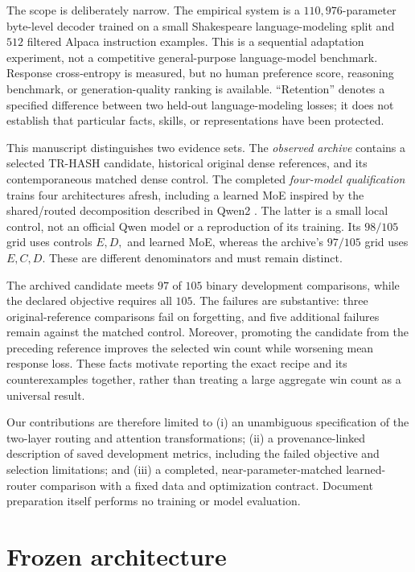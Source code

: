 \documentclass{article}
\newcommand{\Source}{\textsc{TR-HASH}}
\begin{document}
The scope is deliberately narrow. The empirical system is a $110{,}976$-parameter byte-level decoder trained on a small Shakespeare language-modeling split and $512$ filtered Alpaca instruction examples. This is a sequential adaptation experiment, not a competitive general-purpose language-model benchmark. Response cross-entropy is measured, but no human preference score, reasoning benchmark, or generation-quality ranking is available. ``Retention'' denotes a specified difference between two held-out language-modeling losses; it does not establish that particular facts, skills, or representations have been protected.

This manuscript distinguishes two evidence sets. The \emph{observed archive} contains a selected \Source{} candidate, historical original dense references, and its contemporaneous matched dense control. The completed \emph{four-model qualification} trains four architectures afresh, including a learned MoE inspired by the shared/routed decomposition described in Qwen2 \citep{yang2024qwen2}. The latter is a small local control, not an official Qwen model or a reproduction of its training. Its $98/105$ grid uses controls $E,D,$ and learned MoE, whereas the archive's $97/105$ grid uses $E,C,D$. These are different denominators and must remain distinct.

The archived candidate meets $97$ of $105$ binary development comparisons, while the declared objective requires all $105$. The failures are substantive: three original-reference comparisons fail on forgetting, and five additional failures remain against the matched control. Moreover, promoting the candidate from the preceding reference improves the selected win count while worsening mean response loss. These facts motivate reporting the exact recipe and its counterexamples together, rather than treating a large aggregate win count as a universal result.

Our contributions are therefore limited to (i) an unambiguous specification of the two-layer routing and attention transformations; (ii) a provenance-linked description of saved development metrics, including the failed objective and selection limitations; and (iii) a completed, near-parameter-matched learned-router comparison with a fixed data and optimization contract. Document preparation itself performs no training or model evaluation.

\section{Frozen architecture}
\label{sec:architecture}
\end{document}
